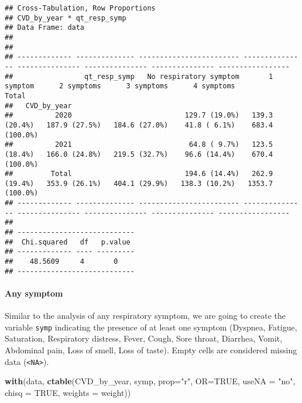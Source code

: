 \documentclass[
]{article}
\newenvironment{Shaded}{\begin{snugshade}}{\end{snugshade}}
\newcommand{\AttributeTok}[1]{\textcolor[rgb]{0.13,0.29,0.53}{#1}}
\newcommand{\ConstantTok}[1]{\textcolor[rgb]{0.56,0.35,0.01}{#1}}
\newcommand{\FunctionTok}[1]{\textcolor[rgb]{0.13,0.29,0.53}{\textbf{#1}}}
\newcommand{\NormalTok}[1]{#1}
\newcommand{\StringTok}[1]{\textcolor[rgb]{0.31,0.60,0.02}{#1}}
\begin{document}
\begin{verbatim}
## Cross-Tabulation, Row Proportions  
## CVD_by_year * qt_resp_symp  
## Data Frame: data  
## 
## 
## ------------- -------------- ------------------------ --------------- --------------- --------------- --------------- -----------------
##                 qt_resp_symp   No respiratory symptom       1 symptom      2 symptoms      3 symptoms      4 symptoms             Total
##   CVD_by_year                                                                                                                          
##          2020                           129.7 (19.0%)   139.3 (20.4%)   187.9 (27.5%)   184.6 (27.0%)    41.8 ( 6.1%)    683.4 (100.0%)
##          2021                            64.8 ( 9.7%)   123.5 (18.4%)   166.0 (24.8%)   219.5 (32.7%)    96.6 (14.4%)    670.4 (100.0%)
##         Total                           194.6 (14.4%)   262.9 (19.4%)   353.9 (26.1%)   404.1 (29.9%)   138.3 (10.2%)   1353.7 (100.0%)
## ------------- -------------- ------------------------ --------------- --------------- --------------- --------------- -----------------
## 
## ----------------------------
##  Chi.squared   df   p.value 
## ------------- ---- ---------
##    48.5609     4       0    
## ----------------------------
\end{verbatim}

\hypertarget{any-symptom}{%
\paragraph{Any symptom}\label{any-symptom}}

Similar to the analysis of any respiratory symptom, we are going to
create the variable \texttt{symp} indicating the presence of at least
one symptom (Dyspnea, Fatigue, Saturation, Respiratory distress, Fever,
Cough, Sore throat, Diarrhea, Vomit, Abdominal pain, Loss of smell, Loss
of taste). Empty cells are considered missing data
(\texttt{\textless{}NA\textgreater{}}).

\begin{Shaded}
\begin{Highlighting}[]
\FunctionTok{with}\NormalTok{(data, }\FunctionTok{ctable}\NormalTok{(CVD\_by\_year, symp, }\AttributeTok{prop=}\StringTok{"r"}\NormalTok{, }\AttributeTok{OR=}\ConstantTok{TRUE}\NormalTok{, }\AttributeTok{useNA =} \StringTok{"no"}\NormalTok{, }\AttributeTok{chisq =} \ConstantTok{TRUE}\NormalTok{, }\AttributeTok{weights =}\NormalTok{ weight))}
\end{Highlighting}
\end{Shaded}
\end{document}

